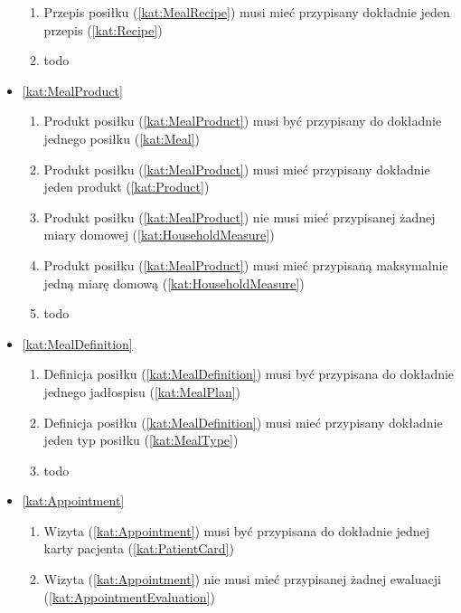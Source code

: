 \begin{itemize}[label={\textbf{Reguły dla}}, wide, labelwidth=!, labelindent=0pt]
\begin{enumerate}[label={\textbf{REG/\protect\threedigits{\arabic{enumi}}}}, wide, labelwidth=!, align=left, leftmargin=3cm, resume]
        \item Przepis posiłku (\ref{kat:MealRecipe}) musi mieć przypisany dokładnie jeden przepis (\ref{kat:Recipe})
        \item todo
    \end{enumerate}
    \item\ref{kat:MealProduct}
    \begin{enumerate}[label={\textbf{REG/\protect\threedigits{\arabic{enumi}}}}, wide, labelwidth=!, align=left, leftmargin=3cm, resume]
        \item Produkt posiłku (\ref{kat:MealProduct}) musi być przypisany do dokładnie jednego posiłku (\ref{kat:Meal})
        \item Produkt posiłku (\ref{kat:MealProduct}) musi mieć przypisany dokładnie jeden produkt (\ref{kat:Product})
        \item Produkt posiłku (\ref{kat:MealProduct}) nie musi mieć przypisanej żadnej miary domowej (\ref{kat:HouseholdMeasure})
        \item Produkt posiłku (\ref{kat:MealProduct}) musi mieć przypisaną maksymalnie jedną miarę domową (\ref{kat:HouseholdMeasure})
        \item todo
    \end{enumerate}
    \item\ref{kat:MealDefinition}
    \begin{enumerate}[label={\textbf{REG/\protect\threedigits{\arabic{enumi}}}}, wide, labelwidth=!, align=left, leftmargin=3cm, resume]
        \item Definicja posiłku (\ref{kat:MealDefinition}) musi być przypisana do dokładnie jednego jadłospisu (\ref{kat:MealPlan})
        \item Definicja posiłku (\ref{kat:MealDefinition}) musi mieć przypisany dokładnie jeden typ posiłku (\ref{kat:MealType})
        \item todo
    \end{enumerate}
    \item\ref{kat:Appointment}
    \begin{enumerate}[label={\textbf{REG/\protect\threedigits{\arabic{enumi}}}}, wide, labelwidth=!, align=left, leftmargin=3cm, resume]
        \item Wizyta (\ref{kat:Appointment}) musi być przypisana do dokładnie jednej karty pacjenta (\ref{kat:PatientCard})
        \item Wizyta (\ref{kat:Appointment}) nie musi mieć przypisanej żadnej ewaluacji (\ref{kat:AppointmentEvaluation})

\end{enumerate}
\end{itemize}
